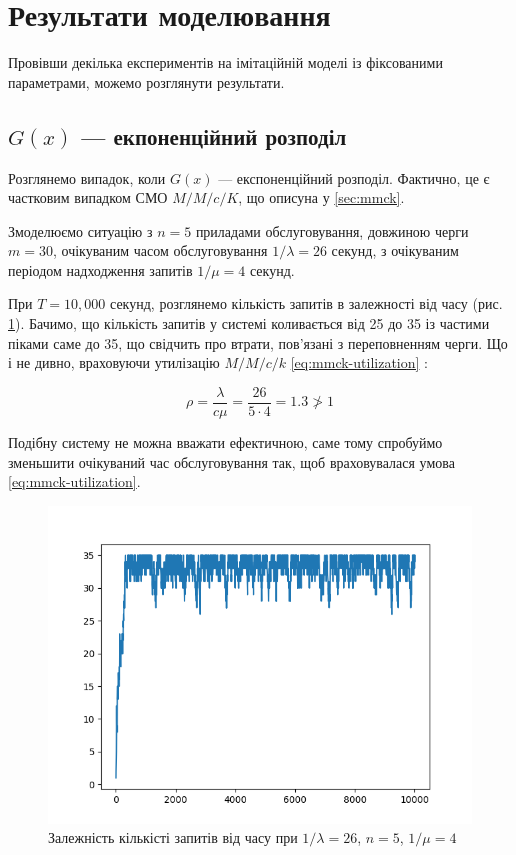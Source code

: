\documentclass[14pt]{extarticle}
\begin{document}
\section{Результати моделювання}

Провівши декілька експериментів на імітаційній моделі із фіксованими
параметрами, можемо розглянути результати.

\subsection{\(G(x)\)  --- екпоненційний розподіл}

Розглянемо випадок, коли \(G(x)\) --- експоненційний розподіл. Фактично, це є
частковим випадком СМО \(M/M/c/K\), що описуна у \ref{sec:mmck}.

Змоделюємо ситуацію з \(n = 5\) приладами обслуговування, довжиною черги
\(m = 30\), очікуваним часом обслуговування \(1 / \lambda = 26\) секунд, з очікуваним
періодом надходження запитів \(1 / \mu = 4\) секунд.

При \(T = 10,000\) секунд, розглянемо кількість запитів в залежності від часу
(рис. \ref{img:exp-fail-first-requests}). Бачимо, що кількість запитів у системі
коливається від 25 до 35 із частими піками саме до 35, що свідчить про втрати,
пов\textquoteright язані з переповненням черги. Що і не дивно, враховуючи
утилізацію \(M/M/c/k\) \ref{eq:mmck-utilization} :

\begin{equation*}
  \rho = \frac{\lambda}{c \mu} = \frac{26}{5 \cdot 4} = 1.3 \ngtr 1
\end{equation*}

Подібну систему не можна вважати ефектичною, саме тому спробуймо зменьшити
очікуваний час обслуговування так, щоб враховувалася умова
\ref{eq:mmck-utilization}.

\begin{figure}
  \centering
  \includegraphics{fail-seconds-requests_in_system.png}\caption{{Залежність
      кількісті запитів від часу при \(1/\lambda = 26\), \(n = 5\),
      \(1/\mu = 4\)}}\label{img:exp-fail-first-requests}
\end{figure}
\end{document}
